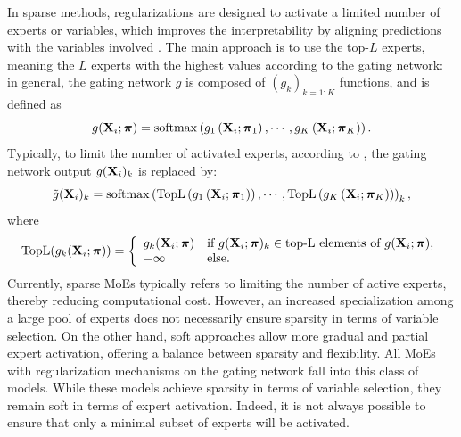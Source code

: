 In sparse methods, regularizations are designed to activate a limited number of experts or variables, which improves the interpretability by aligning predictions with the variables involved \citep{zhou2022mixture}. 
The main approach is to use the top-$L$ experts, meaning the $L$ experts with the highest values according to the gating network:
%
in general, the gating network $g$ is composed of $(g_k)_{k=1:K}$ functions, and is defined as
\begin{equation}
    g(\mathbf{X}_i ; \boldsymbol{\pi}) = \operatorname{softmax} \left(g_1\left(\mathbf{X}_i ; \boldsymbol{\pi}_1 \right), \cdots, g_K\left(\mathbf{X}_i ; \boldsymbol{\pi}_K \right) \right). 
\end{equation}
Typically, to limit the number of activated experts, according to \cite{cai2024survey}, the gating network output $g(\mathbf{X}_i)_k$ is replaced by:
\begin{equation}
\label{eq:g_k}
    \tilde{g}(\mathbf{X}_i)_k = \operatorname{softmax}\left(\operatorname{TopL}\left( g_1\left(\mathbf{X}_i; \boldsymbol{\pi}_1\right) \right),\cdots,\operatorname{TopL}\left(g_K\left(\mathbf{X}_i; \boldsymbol{\pi}_K\right)\right) \right)_k,
\end{equation}
where 
\begin{equation}
    \operatorname{TopL}(g_k(\mathbf{X}_i; \boldsymbol{\pi})) = \left\{
    \begin{array}{ll}
        g_k(\mathbf{X}_i; \boldsymbol{\pi}) & \mbox{if } g(\mathbf{X}_i; \boldsymbol{\pi})_k \in \text{top-L elements of } g(\mathbf{X}_i; \boldsymbol{\pi}), \\
        -\infty & \mbox{else.} 
    \end{array}
    \right.
\end{equation}
%
Currently, sparse MoEs typically refers to limiting the number of active experts, thereby reducing computational cost. However, an increased specialization among a large pool of experts does not necessarily ensure sparsity in terms of variable selection.
%
On the other hand, soft approaches allow more gradual and partial expert activation, offering a balance between sparsity and flexibility. 
All MoEs with regularization mechanisms on the gating network fall into this class of models. 
While these models achieve sparsity in terms of variable selection, they remain soft in terms of expert activation. Indeed, it is not always possible to ensure that only a minimal subset of experts will be activated.

